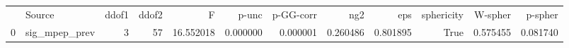 \begin{tabular}{llrrrrrrrrrr}
 & Source & ddof1 & ddof2 & F & p-unc & p-GG-corr & ng2 & eps & sphericity & W-spher & p-spher \\
0 & sig_mpep_prev & 3 & 57 & 16.552018 & 0.000000 & 0.000001 & 0.260486 & 0.801895 & True & 0.575455 & 0.081740 \\
\end{tabular}
